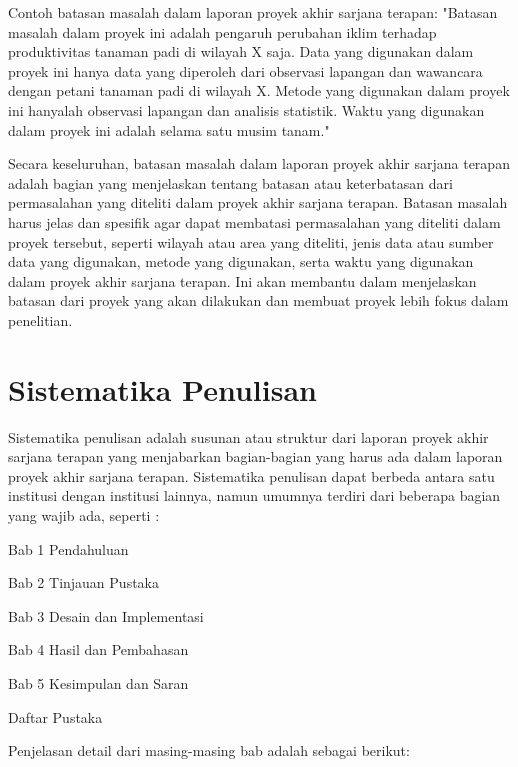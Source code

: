 Contoh batasan masalah dalam laporan proyek akhir sarjana terapan:
"Batasan masalah dalam proyek ini adalah pengaruh perubahan iklim terhadap produktivitas tanaman padi di wilayah X saja. Data yang digunakan dalam proyek ini hanya data yang diperoleh dari observasi lapangan dan wawancara dengan petani tanaman padi di wilayah X. Metode yang digunakan dalam proyek ini hanyalah observasi lapangan dan analisis statistik. Waktu yang digunakan dalam proyek ini adalah selama satu musim tanam."

Secara keseluruhan, batasan masalah dalam laporan proyek akhir sarjana terapan adalah bagian yang menjelaskan tentang batasan atau keterbatasan dari permasalahan yang diteliti dalam proyek akhir sarjana terapan. Batasan masalah harus jelas dan spesifik agar dapat membatasi permasalahan yang diteliti dalam proyek tersebut, seperti wilayah atau area yang diteliti, jenis data atau sumber data yang digunakan, metode yang digunakan, serta waktu yang digunakan dalam proyek akhir sarjana terapan. Ini akan membantu dalam menjelaskan batasan dari proyek yang akan dilakukan dan membuat proyek lebih fokus dalam penelitian.


\section{Sistematika Penulisan}
Sistematika penulisan adalah susunan atau struktur dari laporan proyek akhir sarjana terapan yang menjabarkan bagian-bagian yang harus ada dalam laporan proyek akhir sarjana terapan. Sistematika penulisan dapat berbeda antara satu institusi dengan institusi lainnya, namun umumnya terdiri dari beberapa bagian yang wajib ada, seperti :

\begin{packed_item}
    \item Bab 1 Pendahuluan
    \item Bab 2 Tinjauan Pustaka
    \item Bab 3 Desain dan Implementasi
    \item Bab 4 Hasil dan Pembahasan
    \item Bab 5 Kesimpulan dan Saran
    \item Daftar Pustaka
\end{packed_item}

Penjelasan detail dari masing-masing bab adalah sebagai berikut:

